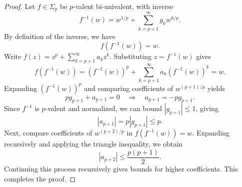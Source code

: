 \begin{proof}
	Let $f \in \Sigma_p$ be $p$-valent bi-univalent, with inverse
	\[
	f^{-1}(w) = w^{1/p} + \sum_{k=p+1}^{\infty} g_k w^{k/p}.
	\]
	By definition of the inverse, we have
	\[
	f(f^{-1}(w)) = w.
	\]
	Write $f(z) = z^p + \sum_{k=p+1}^{\infty} a_k z^k$. Substituting $z = f^{-1}(w)$ gives
	\[
	f(f^{-1}(w)) = (f^{-1}(w))^p + \sum_{k=p+1}^{\infty} a_k (f^{-1}(w))^k = w.
	\]
	Expanding $(f^{-1}(w))^p$ and comparing coefficients of $w^{(p+1)/p}$ yields
	\[
	p g_{p+1} + a_{p+1} = 0 \quad \Rightarrow \quad a_{p+1} = -p g_{p+1}.
	\]
	Since $f^{-1}$ is $p$-valent and normalized, we can bound $|g_{p+1}| \le 1$, giving
	\[
	|a_{p+1}| = p |g_{p+1}| \le p.
	\]
	Next, compare coefficients of $w^{(p+2)/p}$ in $f(f^{-1}(w)) = w$. Expanding recursively and applying the triangle inequality, we obtain
	\[
	|a_{p+2}| \le \frac{p(p+1)}{2}.
	\]
	Continuing this process recursively gives bounds for higher coefficients.
	This completes the proof.
\end{proof}


